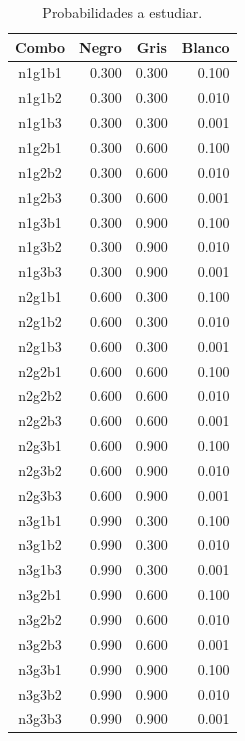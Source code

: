 \documentclass{article}
\begin{document}
\begin{table}[h!]
\centering
\caption{Probabilidades a estudiar.}
\label{tabla1}
\begin{tabular}{|c|r|r|r|}
\hline
\textbf{Combo} & \multicolumn{1}{c|}{\textbf{Negro}} & \multicolumn{1}{c|}{\textbf{Gris}} & \multicolumn{1}{c|}{\textbf{Blanco}} \\ \hline
n1g1b1 & 0.300 & 0.300 & 0.100 \\ \hline
n1g1b2 & 0.300 & 0.300 & 0.010 \\ \hline
n1g1b3 & 0.300 & 0.300 & 0.001 \\ \hline
n1g2b1 & 0.300 & 0.600 & 0.100 \\ \hline
n1g2b2 & 0.300 & 0.600 & 0.010 \\ \hline
n1g2b3 & 0.300 & 0.600 & 0.001 \\ \hline
n1g3b1 & 0.300 & 0.900 & 0.100 \\ \hline
n1g3b2 & 0.300 & 0.900 & 0.010 \\ \hline
n1g3b3 & 0.300 & 0.900 & 0.001 \\ \hline
n2g1b1 & 0.600 & 0.300 & 0.100 \\ \hline
n2g1b2 & 0.600 & 0.300 & 0.010 \\ \hline
n2g1b3 & 0.600 & 0.300 & 0.001 \\ \hline
n2g2b1 & 0.600 & 0.600 & 0.100 \\ \hline
n2g2b2 & 0.600 & 0.600 & 0.010 \\ \hline
n2g2b3 & 0.600 & 0.600 & 0.001 \\ \hline
n2g3b1 & 0.600 & 0.900 & 0.100 \\ \hline
n2g3b2 & 0.600 & 0.900 & 0.010 \\ \hline
n2g3b3 & 0.600 & 0.900 & 0.001 \\ \hline
n3g1b1 & 0.990 & 0.300 & 0.100 \\ \hline
n3g1b2 & 0.990 & 0.300 & 0.010 \\ \hline
n3g1b3 & 0.990 & 0.300 & 0.001 \\ \hline
n3g2b1 & 0.990 & 0.600 & 0.100 \\ \hline
n3g2b2 & 0.990 & 0.600 & 0.010 \\ \hline
n3g2b3 & 0.990 & 0.600 & 0.001 \\ \hline
n3g3b1 & 0.990 & 0.900 & 0.100 \\ \hline
n3g3b2 & 0.990 & 0.900 & 0.010 \\ \hline
n3g3b3 & 0.990 & 0.900 & 0.001 \\ \hline
\end{tabular}
\end{table}
\end{document}
